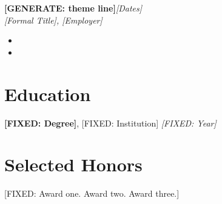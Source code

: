 \documentclass[10pt,letterpaper]{article}
\newcommand{\daterange}[1]{\hfill\textnormal{\textit{#1}}}
\newcommand{\role}[4]{\textbf{#1}\daterange{#4}\\ \textit{#2, #3}\par\vspace{1pt}}
\begin{document}
\role{[GENERATE: theme line]}{[Formal Title]}{[Employer]}{[Dates]}
\begin{itemize}
  \item [GENERATE: ...]
  \item [GENERATE: ...]
\end{itemize}

\section{Education}
\textbf{[FIXED: Degree]}, [FIXED: Institution] \daterange{[FIXED: Year]}\\
[FIXED: honors / thesis if any]

\section{Selected Honors}
[FIXED: Award one. Award two. Award three.]
\end{document}
